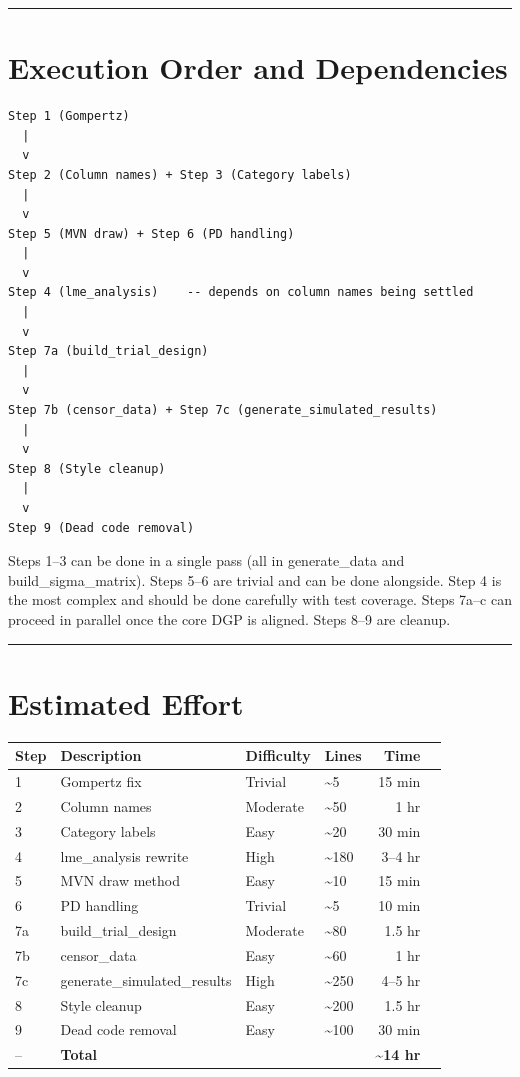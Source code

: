 \documentclass[11pt]{article}
\begin{document}
\bigskip\noindent\rule{\textwidth}{0.4pt}\bigskip

\section{Execution Order and Dependencies}

\begin{verbatim}
Step 1 (Gompertz)
  |
  v
Step 2 (Column names) + Step 3 (Category labels)
  |
  v
Step 5 (MVN draw) + Step 6 (PD handling)
  |
  v
Step 4 (lme_analysis)    -- depends on column names being settled
  |
  v
Step 7a (build_trial_design)
  |
  v
Step 7b (censor_data) + Step 7c (generate_simulated_results)
  |
  v
Step 8 (Style cleanup)
  |
  v
Step 9 (Dead code removal)
\end{verbatim}

Steps 1--3 can be done in a single pass (all in generate\_data
and build\_sigma\_matrix). Steps 5--6 are trivial and can be done
alongside. Step 4 is the most complex and should be done
carefully with test coverage. Steps 7a--c can proceed in parallel
once the core DGP is aligned. Steps 8--9 are cleanup.

\bigskip\noindent\rule{\textwidth}{0.4pt}\bigskip

\section{Estimated Effort}

\begin{table}[h]
\centering
\begin{tabular}{llllrr}
\toprule
Step & Description & Difficulty & Lines & Time \\
\midrule
1 & Gompertz fix & Trivial & \textasciitilde 5 & 15 min \\
2 & Column names & Moderate & \textasciitilde 50 & 1 hr \\
3 & Category labels & Easy & \textasciitilde 20 & 30 min \\
4 & lme\_analysis rewrite & High & \textasciitilde 180 & 3--4 hr \\
5 & MVN draw method & Easy & \textasciitilde 10 & 15 min \\
6 & PD handling & Trivial & \textasciitilde 5 & 10 min \\
7a & build\_trial\_design & Moderate & \textasciitilde 80 & 1.5 hr \\
7b & censor\_data & Easy & \textasciitilde 60 & 1 hr \\
7c & generate\_simulated\_results & High & \textasciitilde 250 & 4--5 hr \\
8 & Style cleanup & Easy & \textasciitilde 200 & 1.5 hr \\
9 & Dead code removal & Easy & \textasciitilde 100 & 30 min \\
\midrule
-- & \textbf{Total} & & & \textbf{\textasciitilde 14 hr} \\
\bottomrule
\end{tabular}
\end{table}
\end{document}
